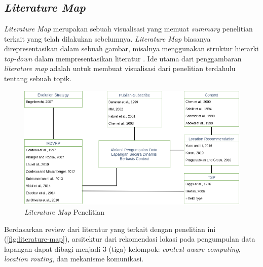\chapter{\babDua}


\section{\textit{Literature Map}}
\label{sec:literature-map}
\textit{Literature Map} merupakan sebuah visualisasi yang memuat \textit{summary} penelitian terkait yang telah dilakukan sebelumnya. \textit{Literature Map} biasanya direpresentasikan dalam sebuah gambar, misalnya menggunakan struktur hierarki \textit{top-down} dalam mempresentasikan literatur \citep{creswell_research_2013}. Ide utama dari penggambaran \textit{literature map} adalah untuk membuat visualisasi dari penelitian terdahulu tentang sebuah topik. 

\begin{figure}[!]
	\centering
	\includegraphics[width=\textwidth]{Resources/Images/literature-map}
	\captionsetup{format=hang}
	\caption{\textit{Literature Map} Penelitian}
	\label{fig:literature-map}
\end{figure}


Berdasarkan review dari literatur yang terkait dengan penelitian ini (\autoref{fig:literature-map}), arsitektur dari rekomendasi lokasi pada pengumpulan data lapangan dapat dibagi menjadi 3 (tiga) kelompok: \textit{context-aware computing}, \textit{location routing}, dan mekanisme komunikasi.


